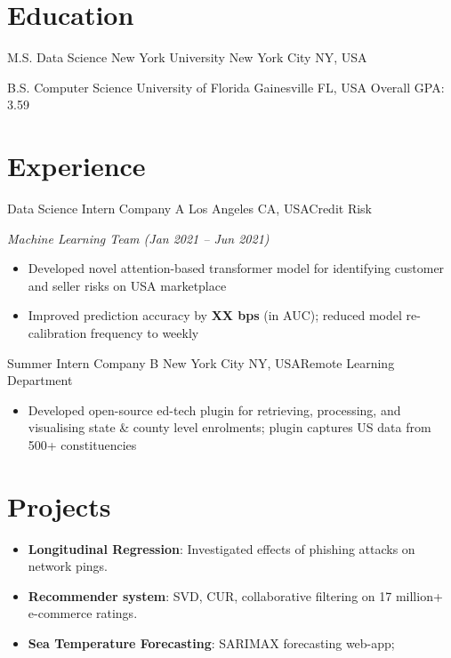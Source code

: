 \documentclass[12pt, a4paper]{moderncv}
\begin{document}
\maketitle
\section{Education}
{M.S. Data Science}
{New York University}
{New York City NY, USA}{}{}

{B.S. Computer Science}
{University of Florida}
{Gainesville FL, USA}
{}{Overall GPA: 3.59}

\section{Experience}
{Data Science Intern}
{Company A}
{Los Angeles CA, USA}{Credit Risk}
{
    \textit{Machine Learning Team (Jan 2021 -- Jun 2021)}
    \begin{itemize}
        \item Developed novel attention-based transformer model for identifying customer 
        and seller risks on USA marketplace
        \item Improved prediction accuracy by \textbf{XX bps} (in AUC); 
        reduced model re-calibration frequency to weekly
    \end{itemize}
}
\vspace{4px}
{Summer Intern}
{Company B}
{New York City NY, USA}{Remote Learning Department}
{
    \begin{itemize}
        \item Developed open-source ed-tech plugin for retrieving, 
        processing, and visualising state \& county 
        level enrolments; plugin captures US data from 
        500+ constituencies
    \end{itemize}
}

\section{Projects}
\begin{itemize}
    \item \textbf{Longitudinal Regression}: Investigated effects of phishing attacks on network pings.
    \item \textbf{Recommender system}: SVD, CUR, collaborative filtering on 17 million+ e-commerce ratings.
    \item \textbf{Sea Temperature Forecasting}: SARIMAX forecasting web-app;
    \textbf{\color{blue}}
\end{itemize}
\end{document}
